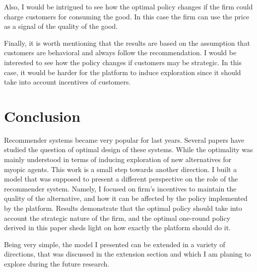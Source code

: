\documentclass[a4paper]{article}
\begin{document}
Also, I would be intrigued to see how the optimal policy changes if the firm could charge customers for consuming the good. In this case the firm can use the price as a signal of the quality of the good. 




Finally, it is worth mentioning that the results are based on the assumption that customers are behavioral and always follow the recommendation. I would be interested to see how the policy changes if customers may be strategic. In this case, it would be harder for the platform to induce exploration since it should take into account incentives of customers. 
\section{Conclusion}
Recommender systems became very popular for last years. Several papers have studied the question of optimal design of these systems. While the optimality was mainly understood in terms of inducing exploration of new alternatives for myopic agents. This work is a small step towards another direction. I built a model that was supposed to present a different perspective on the role of the recommender system. Namely, I focused on firm's incentives to maintain the quality of the alternative, and how it can be affected by the policy implemented by the platform. Results demonstrate that the optimal policy should take into account the strategic nature of the firm, and the optimal one-round policy derived in this paper sheds light on how exactly the platform should do it. 


Being very simple, the model I presented can be extended in a variety of directions, that was discussed in the extension section and which I am planing to explore during the future research.


\newpage
{}
%

\end{document}

